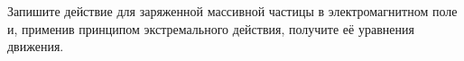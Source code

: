 \documentclass[__main__.tex]{subfiles}
\begin{document}
Запишите действие для заряженной массивной частицы в электромагнитном поле и, применив принципом экстремального действия, получите её уравнения движения.\\ 

\end{document}
